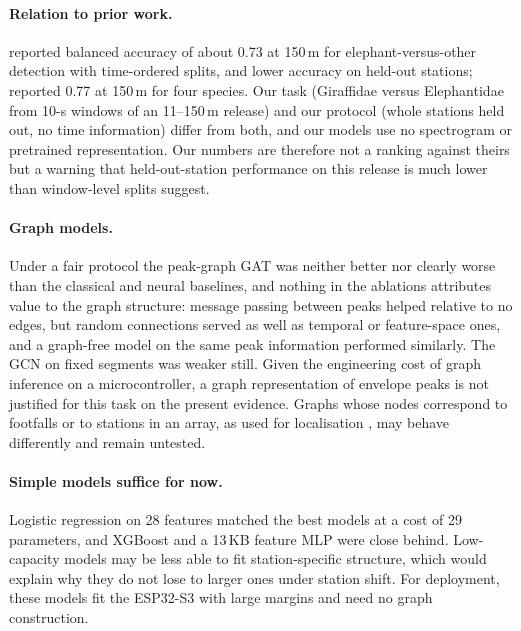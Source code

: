 \documentclass[a4paper,fleqn]{cas-dc}
\begin{document}
\paragraph{Relation to prior work.} \citet{szenicer2022} reported balanced accuracy of
about 0.73 at 150\,m for elephant-versus-other detection with time-ordered splits, and
lower accuracy on held-out stations; \citet{steinmann2025} reported 0.77 at 150\,m for
four species. Our task (Giraffidae versus Elephantidae from 10-s windows of an 11--150\,m
release) and our protocol (whole stations held out, no time information) differ from
both, and our models use no spectrogram or pretrained representation. Our numbers are
therefore not a ranking against theirs but a warning that held-out-station performance
on this release is much lower than window-level splits suggest.

\paragraph{Graph models.} Under a fair protocol the peak-graph GAT was neither better nor
clearly worse than the classical and neural baselines, and nothing in the ablations
attributes value to the graph structure: message passing between peaks helped relative
to no edges, but random connections served as well as temporal or feature-space ones,
and a graph-free model on the same peak information performed similarly. The GCN on
fixed segments was weaker still. Given the engineering cost of graph inference on a
microcontroller, a graph representation of envelope peaks is not justified for this task
on the present evidence. Graphs whose nodes correspond to footfalls or to stations in an
array, as used for localisation \citep{reinwald2021}, may behave differently and remain
untested.

\paragraph{Simple models suffice for now.} Logistic regression on 28 features matched the
best models at a cost of 29 parameters, and XGBoost and a 13\,KB feature MLP were close
behind. Low-capacity models may be less able to fit station-specific structure, which
would explain why they do not lose to larger ones under station shift. For deployment,
these models fit the ESP32-S3 with large margins and need no graph construction.
\end{document}
